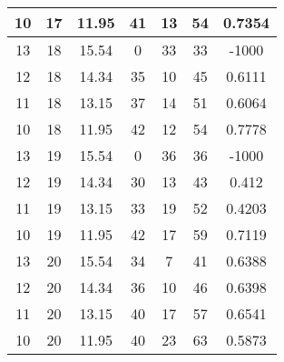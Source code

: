 \documentclass[letterpaper, 12pt]{article}
\begin{document}
\begin{longtable}{|c|c|c|c|c|c|c|}
10 & 17 & 11.95 & 41 & 13 & 54 & 0.7354 \\
\hline
13 & 18 & 15.54 & 0 & 33 & 33 & -1000 \\
\hline
12 & 18 & 14.34 & 35 & 10 & 45 & 0.6111 \\
\hline
11 & 18 & 13.15 & 37 & 14 & 51 & 0.6064 \\
\hline
10 & 18 & 11.95 & 42 & 12 & 54 & 0.7778 \\
\hline
13 & 19 & 15.54 & 0 & 36 & 36 & -1000 \\
\hline
12 & 19 & 14.34 & 30 & 13 & 43 & 0.412 \\
\hline
11 & 19 & 13.15 & 33 & 19 & 52 & 0.4203 \\
\hline
10 & 19 & 11.95 & 42 & 17 & 59 & 0.7119 \\
\hline
13 & 20 & 15.54 & 34 & 7 & 41 & 0.6388 \\
\hline
12 & 20 & 14.34 & 36 & 10 & 46 & 0.6398 \\
\hline
11 & 20 & 13.15 & 40 & 17 & 57 & 0.6541 \\
\hline
10 & 20 & 11.95 & 40 & 23 & 63 & 0.5873 \\
\hline
\end{longtable}
\end{document}
